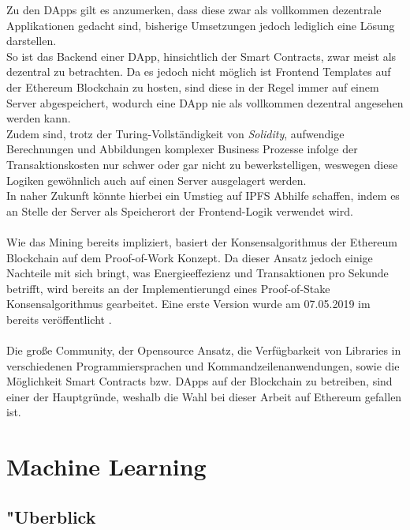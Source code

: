 Zu den DApps gilt es anzumerken, dass diese zwar als vollkommen dezentrale Applikationen gedacht sind, bisherige Umsetzungen jedoch lediglich eine  Lösung darstellen. \\
So ist das Backend einer DApp, hinsichtlich der Smart Contracts, zwar meist als dezentral zu betrachten. Da es jedoch nicht möglich ist Frontend Templates auf der Ethereum Blockchain zu hosten, sind diese in der Regel immer auf einem Server abgespeichert, wodurch eine DApp nie als vollkommen dezentral angesehen werden kann. \\
Zudem sind, trotz der Turing-Vollständigkeit von \textit{Solidity}, aufwendige Berechnungen und Abbildungen komplexer Business Prozesse infolge der Transaktionskosten nur schwer oder gar nicht zu bewerkstelligen, weswegen diese Logiken gewöhnlich auch auf einen Server ausgelagert werden.\\
In naher Zukunft könnte hierbei ein Umstieg auf IPFS Abhilfe schaffen, indem es an Stelle der Server als Speicherort der Frontend-Logik verwendet wird.  \\\\
Wie das Mining bereits impliziert, basiert der Konsensalgorithmus der Ethereum Blockchain auf dem Proof-of-Work Konzept. Da dieser Ansatz jedoch einige Nachteile mit sich bringt, was Energieeffezienz und Transaktionen pro Sekunde betrifft, wird bereits an der Implementierungd eines Proof-of-Stake Konsensalgorithmus gearbeitet. Eine erste Version wurde am 07.05.2019 im  bereits veröffentlicht \cite{ETH20:PRYSM}. \\\\
Die große Community, der Opensource Ansatz, die Verfügbarkeit von Libraries in verschiedenen Programmiersprachen und Kommandzeilenanwendungen, sowie die Möglichkeit Smart Contracts bzw. DApps auf der Blockchain zu betreiben, sind einer der Hauptgründe, weshalb die Wahl bei dieser Arbeit auf Ethereum gefallen ist.   
\cite{BitcoinEthNCo,DL:bafin,Antonopoulos:2017:MBP:3164842}

\clearpage
\section{Machine Learning}
\subsection{"Uberblick}

